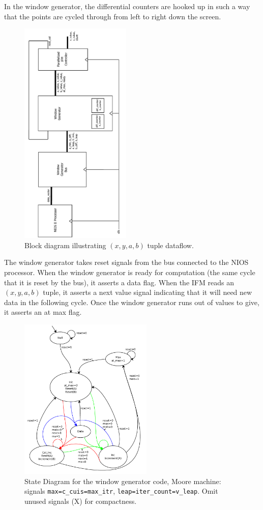 \documentclass{article}
\begin{document}
In the window generator, the differential counters are hooked up in such a way that the points are cycled through
from left to right down the screen.

\begin{figure}[H]
  \centering
    \includegraphics[width=150pt, angle=270]{block_diagrams/win_gen_interior.pdf}
  \caption{Block diagram illustrating $(x, y, a, b)$ tuple dataflow.}
\end{figure}

The window generator takes reset signals from the bus connected to the NIOS processor. When the window
generator is ready for computation (the same cycle that it is reset by the bus), it asserts a data flag.
When the IFM reads an $(x, y, a, b)$ tuple, it asserts a next value signal indicating that it will need new data in the following cycle. Once the window generator runs out of values to give, it asserts an at max flag.

\begin{figure}[H]
  \centering
    \includegraphics[width=180pt]{state_diagrams/diff_window_gen.pdf}
  \caption{State Diagram for the window generator code, Moore machine:
    signals \texttt{max=c\_cuis=max\_itr},
    \texttt{leap=iter\_count=v\_leap}. Omit unused signals (X) for
    compactness.}
\end{figure}
\end{document}

